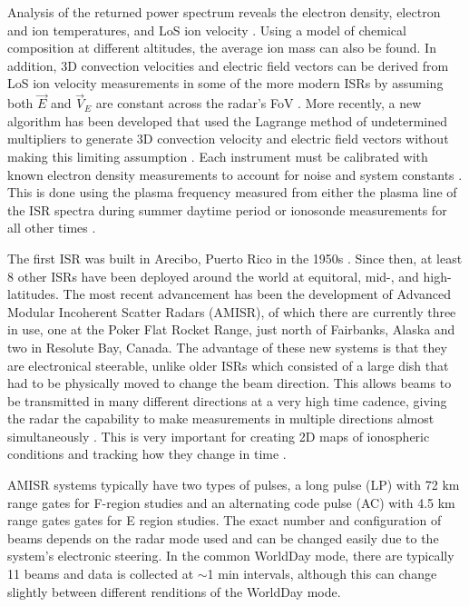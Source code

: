 Analysis of the returned power spectrum reveals the electron density, electron and ion temperatures, and LoS ion velocity \citep{Evans1969,Rishbeth1985,Nicolls2007a}.  Using a model of chemical composition at different altitudes, the average ion mass can also be found.  In addition, 3D convection velocities and electric field vectors can be derived from LoS ion velocity measurements in some of the more modern ISRs by assuming both \(\vec{E}\) and \(\vec{V}_E\) are constant across the radar's FoV \citep{Heinselman2008}.  More recently, a new algorithm has been developed that used the Lagrange method of undetermined multipliers to generate 3D convection velocity and electric field vectors without making this limiting assumption \citep{Nicolls2014}.  Each instrument must be calibrated with known electron density measurements to account for noise and system constants \citep{Nicolls2007a}.  This is done using the plasma frequency measured from either the plasma line of the ISR spectra during summer daytime period or ionosonde measurements for all other times \citep{Bahcivan2010,Themens2014}.

The first ISR was built in Arecibo, Puerto Rico in the 1950s \citep{Gordon1958}.  Since then, at least 8 other ISRs have been deployed around the world at equitoral, mid-, and high-latitudes.  The most recent advancement has been the development of Advanced Modular Incoherent Scatter Radars (AMISR), of which there are currently three in use, one at the Poker Flat Rocket Range, just north of Fairbanks, Alaska and two in Resolute Bay, Canada.  The advantage of these new systems is that they are electronical steerable, unlike older ISRs which consisted of a large dish that had to be physically moved to change the beam direction.  This allows beams to be transmitted in many different directions at a very high time cadence, giving the radar the capability to make measurements in multiple directions almost simultaneously \citep{Nicolls2007a,Nicolls2007b,Bahcivan2010}.  This is very important for creating 2D maps of ionospheric conditions and tracking how they change in time \citep{Semeter2009,Dahlgren2012a,Dahlgren2012b}.

AMISR systems typically have two types of pulses, a long pulse (LP) with 72 km range gates for F-region studies and an alternating code pulse (AC) with 4.5 km range gates gates for E region studies.  The exact number and configuration of beams depends on the radar mode used and can be changed easily due to the system's electronic steering.  In the common WorldDay mode, there are typically 11 beams and data is collected at \(\sim\)1 min intervals, although this can change slightly between different renditions of the WorldDay mode.

